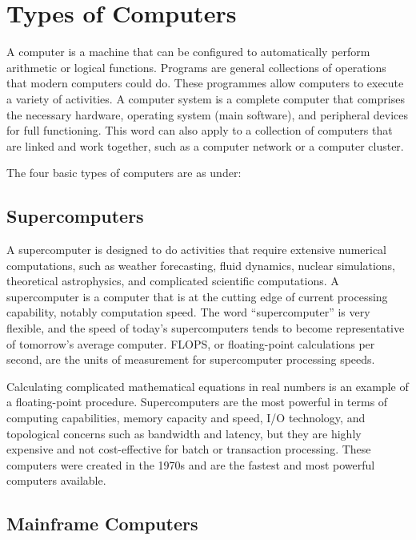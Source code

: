 \documentclass[british]{extreport}
\begin{document}
\section{Types of Computers}

A computer is a machine that can be configured to automatically perform
arithmetic or logical functions. Programs are general collections
of operations that modern computers could do. These programmes allow
computers to execute a variety of activities. A computer system is
a \textquotedbl complete\textquotedbl{} computer that comprises the
necessary hardware, operating system (main software), and peripheral
devices for \textquotedbl full\textquotedbl{} functioning. This word
can also apply to a collection of computers that are linked and work
together, such as a computer network or a computer cluster.

\noindent The four basic types of computers are as under:

\subsection{Supercomputers}

\noindent A supercomputer is designed to do activities that require
extensive numerical computations, such as weather forecasting, fluid
dynamics, nuclear simulations, theoretical astrophysics, and complicated
scientific computations. A supercomputer is a computer that is at
the cutting edge of current processing capability, notably computation
speed. The word \textquotedblleft supercomputer\textquotedblright{}
is very flexible, and the speed of today's supercomputers tends to
become representative of tomorrow's average computer. FLOPS, or floating-point
calculations per second, are the units of measurement for supercomputer
processing speeds.

\noindent Calculating complicated mathematical equations in real numbers
is an example of a floating-point procedure. Supercomputers are the
most powerful in terms of computing capabilities, memory capacity
and speed, I/O technology, and topological concerns such as bandwidth
and latency, but they are highly expensive and not cost-effective
for batch or transaction processing. These computers were created
in the 1970s and are the fastest and most powerful computers available.

\subsection{Mainframe Computers}
\end{document}
